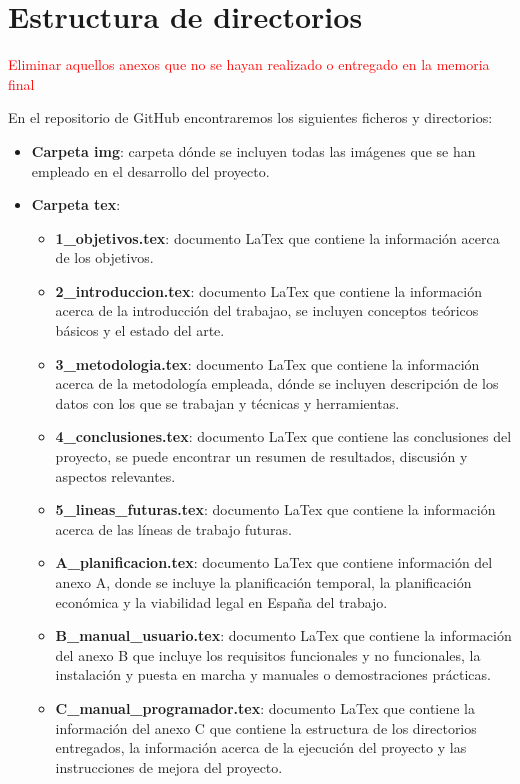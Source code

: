 
\section{Estructura de directorios}

\textcolor{red}{Eliminar aquellos anexos que no se hayan realizado o entregado en la memoria final}

En el repositorio de GitHub encontraremos los siguientes ficheros y directorios:
\begin{itemize}
    \item \textbf{Carpeta img}: carpeta dónde se incluyen todas las imágenes que se han empleado en el desarrollo del proyecto.
    \item \textbf{Carpeta tex}:
    \begin{itemize}
        \item \textbf{1\_objetivos.tex}: documento LaTex que contiene la información acerca de los objetivos.
        \item \textbf{2\_introduccion.tex}: documento LaTex que contiene la información acerca de la introducción del trabajao, se incluyen conceptos teóricos básicos y el estado del arte.
        \item \textbf{3\_metodologia.tex}: documento LaTex que contiene la información acerca de la metodología empleada, dónde se incluyen descripción de los datos con los que se trabajan y técnicas y herramientas. 
        \item \textbf{4\_conclusiones.tex}: documento LaTex que contiene las conclusiones del proyecto, se puede encontrar un resumen de resultados, discusión y aspectos relevantes.
        \item \textbf{5\_lineas\_futuras.tex}: documento LaTex que contiene la información acerca de las líneas de trabajo futuras.
        \item \textbf{A\_planificacion.tex}: documento LaTex que contiene información del anexo A, donde se incluye la planificación temporal, la planificación económica y la viabilidad legal en España del trabajo.
        \item \textbf{B\_manual\_usuario.tex}: documento LaTex que contiene la información del anexo B que incluye los requisitos funcionales y no funcionales, la instalación y puesta en marcha y manuales o demostraciones prácticas.
        \item \textbf{C\_manual\_programador.tex}: documento LaTex que contiene la información del anexo C que contiene la estructura de los directorios entregados, la información acerca de la ejecución del proyecto y las instrucciones de mejora del proyecto.

\end{itemize}
\end{itemize}
